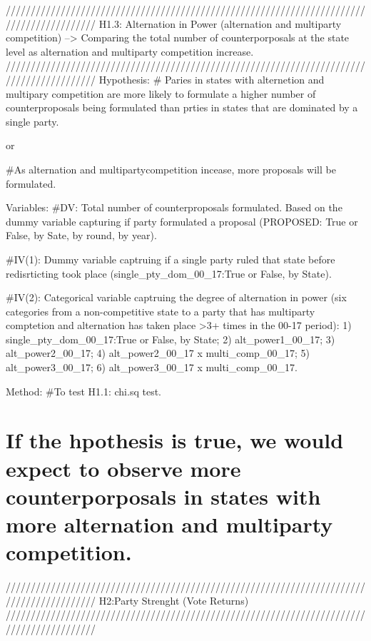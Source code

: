 \documentclass[
]{article}
\begin{document}
//////////////////////////////////////////////////////////////////////////////////////////
H1.3: Alternation in Power (alternation and multiparty competition)
--\textgreater{} Comparing the total number of counterporposals at the
state level as alternation and multiparty competition increase.
//////////////////////////////////////////////////////////////////////////////////////////
Hypothesis: \# Paries in states with alternetion and multipary
competition are more likely to formulate a higher number of
counterproposals being formulated than prties in states that are
dominated by a single party.

or

\#As alternation and multipartycompetition incease, more proposals will
be formulated.

Variables: \#DV: Total number of counterproposals formulated. Based on
the dummy variable capturing if party formulated a proposal (PROPOSED:
True or False, by Sate, by round, by year).

\#IV(1): Dummy variable captruing if a single party ruled that state
before redisrticting took place (single\_pty\_dom\_00\_17:True or False,
by State).

\#IV(2): Categorical variable captruing the degree of alternation in
power (six categories from a non-competitive state to a party that has
multiparty comptetion and alternation has taken place \textgreater3+
times in the 00-17 period): 1) single\_pty\_dom\_00\_17:True or False,
by State; 2) alt\_power1\_00\_17; 3) alt\_power2\_00\_17; 4)
alt\_power2\_00\_17 x multi\_comp\_00\_17; 5) alt\_power3\_00\_17; 6)
alt\_power3\_00\_17 x multi\_comp\_00\_17.

Method: \#To test H1.1: chi.sq test.

\hypertarget{if-the-hpothesis-is-true-we-would-expect-to-observe-more-counterporposals-in-states-with-more-alternation-and-multiparty-competition.}{%
\section{If the hpothesis is true, we would expect to observe more
counterporposals in states with more alternation and multiparty
competition.}\label{if-the-hpothesis-is-true-we-would-expect-to-observe-more-counterporposals-in-states-with-more-alternation-and-multiparty-competition.}}

//////////////////////////////////////////////////////////////////////////////////////////
H2:Party Strenght (Vote Returns)
//////////////////////////////////////////////////////////////////////////////////////////
\end{document}

